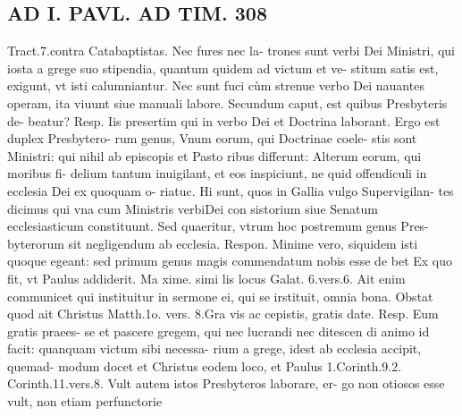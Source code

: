 \documentclass{article}
\begin{document}
\begin{pages}
\section*{AD I. PAVL. AD TIM. 308 }
\marginpar{[ p.]}\pstart Tract.7.contra Catabaptistas. Nec fures nec la- trones sunt verbi Dei Ministri, qui iosta a grege suo stipendia, quantum quidem ad victum et ve- stitum satis est, exigunt, vt isti calumniantur. Nec sunt fuci cùm strenue verbo Dei nauantes operam, ita viuunt siue manuali labore.  \pend\pstart Secundum caput, est quibus Presbyteris de- beatur? Resp. Iis presertim qui in verbo Dei et Doctrina laborant. Ergo est duplex Presbytero- rum genus, Vnum eorum, qui Doctrinae coele- stis sont Ministri: qui nihil ab episcopis et Pasto ribus differunt: Alterum eorum, qui moribus fi- delium tantum inuigilant, et eos inspiciunt, ne quid offendiculi in ecclesia Dei ex quoquam o- riatuc. Hi sunt, quos in Gallia vulgo Supervigilan- tes dicimus qui vna cum Ministris verbiDei con sistorium siue Senatum ecclesiasticum constituunt. Sed quaeritur, vtrum hoc postremum genus Pres- byterorum sit negligendum ab ecclesia. Respon. Minime vero, siquidem isti quoque egeant: sed primum genus magis commendatum nobis esse de bet Ex quo fit, vt Paulus addiderit. Ma xime. simi lis locus Galat. 6.vers.6. Ait enim communicet qui instituitur in sermone ei, qui se irstituit, omnia bona. Obstat quod ait Christus Matth.1o. vers. 8.Gra vis ac cepistis, gratis date. Resp. Eum gratis praees- se et pascere gregem, qui nec lucrandi nec ditescen di animo id facit: quanquam victum sibi necessa- rium a grege, idest ab ecclesia accipit, quemad- modum docet et Christus eodem loco, et Paulus 1.Corinth.9.2. Corinth.11.vers.8.  \pend\pstart Vult autem istos Presbyteros laborare, er- go non otiosos esse vult, non etiam perfunctorie  \pend

\end{pages}
\end{document}
